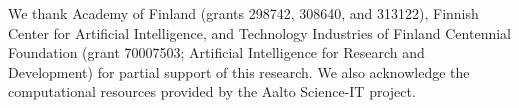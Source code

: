 \begin{acknowledgements}
We thank Academy of Finland (grants 298742, 308640, and 313122), Finnish Center for Artificial Intelligence, and Technology Industries of Finland Centennial Foundation (grant 70007503; Artificial Intelligence for Research and Development) for partial support of this research. We also acknowledge the computational resources provided by the Aalto Science-IT project.
\end{acknowledgements}


%
%






